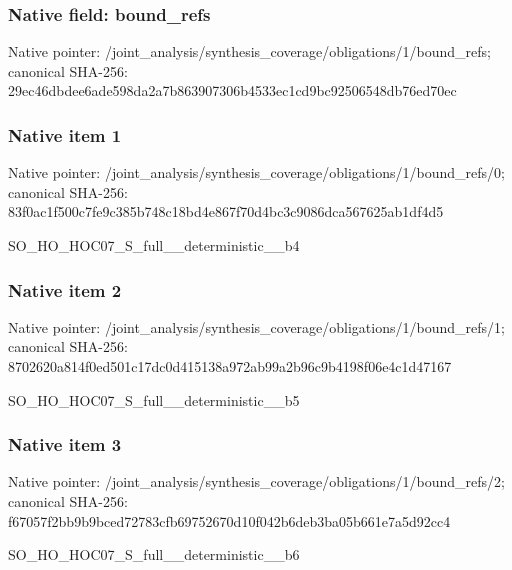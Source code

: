 \documentclass[10pt,a4paper]{article}
\begin{document}
\subsubsection{Native field: bound\_\allowbreak{}refs}
Native pointer: /joint\_\allowbreak{}analysis/synthesis\_\allowbreak{}coverage/obligations/1/bound\_\allowbreak{}refs; canonical SHA-256: 29ec46dbdee6ade598da2a7b863907306b4533ec1cd9bc92506548db76ed70ec

\subsubsection{Native item 1}
Native pointer: /joint\_\allowbreak{}analysis/synthesis\_\allowbreak{}coverage/obligations/1/bound\_\allowbreak{}refs/0; canonical SHA-256: 83f0ac1f500c7fe9c385b748c18bd4e867f70d4bc3c9086dca567625ab1df4d5

\begingroup\raggedright\sloppy SO\_\allowbreak{}HO\_\allowbreak{}HOC07\_\allowbreak{}S\_\allowbreak{}full\_\allowbreak{}\_\allowbreak{}deterministic\_\allowbreak{}\_\allowbreak{}b4\par\endgroup

\subsubsection{Native item 2}
Native pointer: /joint\_\allowbreak{}analysis/synthesis\_\allowbreak{}coverage/obligations/1/bound\_\allowbreak{}refs/1; canonical SHA-256: 8702620a814f0ed501c17dc0d415138a972ab99a2b96c9b4198f06e4c1d47167

\begingroup\raggedright\sloppy SO\_\allowbreak{}HO\_\allowbreak{}HOC07\_\allowbreak{}S\_\allowbreak{}full\_\allowbreak{}\_\allowbreak{}deterministic\_\allowbreak{}\_\allowbreak{}b5\par\endgroup

\subsubsection{Native item 3}
Native pointer: /joint\_\allowbreak{}analysis/synthesis\_\allowbreak{}coverage/obligations/1/bound\_\allowbreak{}refs/2; canonical SHA-256: f67057f2bb9b9bced72783cfb69752670d10f042b6deb3ba05b661e7a5d92cc4

\begingroup\raggedright\sloppy SO\_\allowbreak{}HO\_\allowbreak{}HOC07\_\allowbreak{}S\_\allowbreak{}full\_\allowbreak{}\_\allowbreak{}deterministic\_\allowbreak{}\_\allowbreak{}b6\par\endgroup
\end{document}
